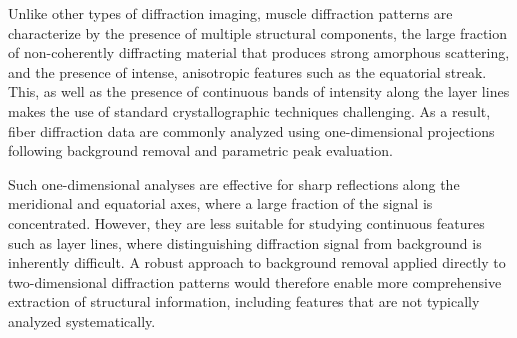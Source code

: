\documentclass[iucr]{iucrjournals}
\begin{document}



Unlike other types of diffraction imaging, muscle diffraction patterns are characterize by the presence of multiple structural components, the large fraction of non-coherently diffracting material that produces strong amorphous scattering, and the presence of intense, anisotropic features such as the equatorial streak. This, as well as the presence of continuous bands of intensity along the layer lines makes the use of standard crystallographic techniques challenging.  As a result, fiber diffraction data are commonly analyzed using one-dimensional projections following background removal and parametric peak evaluation. 

Such one-dimensional analyses are effective for sharp reflections along the meridional and equatorial axes, where a large fraction of the signal is concentrated. However, they are less suitable for studying continuous features such as layer lines, where distinguishing diffraction signal from background is inherently difficult. A robust approach to background removal applied directly to two-dimensional diffraction patterns would therefore enable more comprehensive extraction of structural information, including features that are not typically analyzed systematically.
\end{document}
